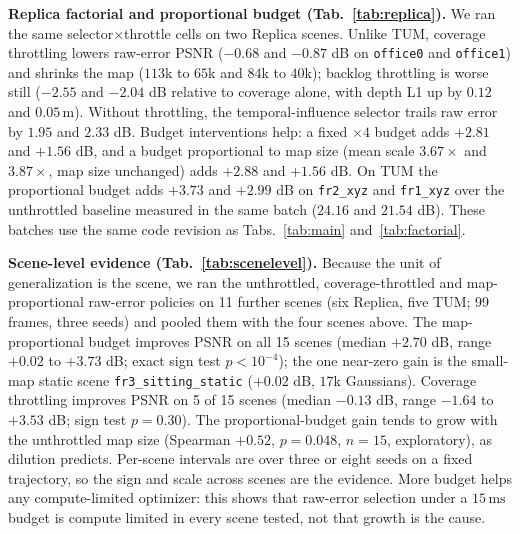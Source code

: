 \textbf{Replica factorial and proportional budget (Tab.~\ref{tab:replica}).}
We ran the same selector$\times$throttle cells on two Replica scenes. Unlike TUM, coverage throttling lowers raw-error PSNR ($-0.68$ and $-0.87$ dB on \texttt{office0} and \texttt{office1}) and shrinks the map ($113$k to $65$k and $84$k to $40$k); backlog throttling is worse still ($-2.55$ and $-2.04$ dB relative to coverage alone, with depth L1 up by $0.12$ and $0.05$\,m). Without throttling, the temporal-influence selector trails raw error by $1.95$ and $2.33$ dB. Budget interventions help: a fixed $\times4$ budget adds $+2.81$ and $+1.56$ dB, and a budget proportional to map size (mean scale $3.67\times$ and $3.87\times$, map size unchanged) adds $+2.88$ and $+1.56$ dB. On TUM the proportional budget adds $+3.73$ and $+2.99$ dB on \texttt{fr2\_xyz} and \texttt{fr1\_xyz} over the unthrottled baseline measured in the same batch ($24.16$ and $21.54$ dB). These batches use the same code revision as Tabs.~\ref{tab:main} and~\ref{tab:factorial}.


\textbf{Scene-level evidence (Tab.~\ref{tab:scenelevel}).}
Because the unit of generalization is the scene, we ran the unthrottled, coverage-throttled and map-proportional raw-error policies on 11 further scenes (six Replica, five TUM; 99 frames, three seeds) and pooled them with the four scenes above. The map-proportional budget improves PSNR on all 15 scenes (median $+2.70$ dB, range $+0.02$ to $+3.73$ dB; exact sign test $p<10^{-4}$); the one near-zero gain is the small-map static scene \texttt{fr3\_sitting\_static} ($+0.02$ dB, $17$k Gaussians). Coverage throttling improves PSNR on 5 of 15 scenes (median $-0.13$ dB, range $-1.64$ to $+3.53$ dB; sign test $p=0.30$). The proportional-budget gain tends to grow with the unthrottled map size (Spearman $+0.52$, $p=0.048$, $n=15$, exploratory), as dilution predicts. Per-scene intervals are over three or eight seeds on a fixed trajectory, so the sign and scale across scenes are the evidence. More budget helps any compute-limited optimizer: this shows that raw-error selection under a $15\,\mathrm{ms}$ budget is compute limited in every scene tested, not that growth is the cause.



